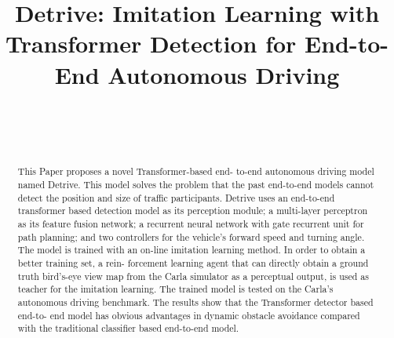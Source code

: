 \documentclass[conference]{IEEEtran}
\begin{document}
\title{Detrive: Imitation Learning with Transformer Detection for End-to-End Autonomous Driving
}

\author{

\\


\and 


\\

}

\maketitle

\begin{abstract}
This Paper proposes a novel Transformer-based end- to-end autonomous driving model named Detrive. This model solves the problem that the past end-to-end models cannot detect the position and size of traffic participants. Detrive uses an end-to-end transformer based detection model as its perception module; a multi-layer perceptron as its feature fusion network; a recurrent neural network with gate recurrent unit for path planning; and two controllers for the vehicle's forward speed and turning angle. The model is trained with an on-line imitation learning method. In order to obtain a better training set, a rein- forcement learning agent that can directly obtain a ground truth bird's-eye view map from the Carla simulator as a perceptual output, is used as teacher for the imitation learning. The trained model is tested on the Carla's autonomous driving benchmark. The results show that the Transformer detector based end-to- end model has obvious advantages in dynamic obstacle avoidance compared with the traditional classifier based end-to-end model.
\end{abstract}
\end{document}
